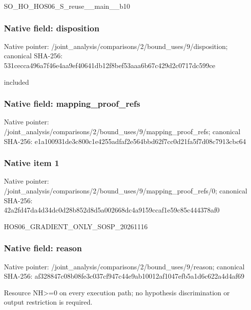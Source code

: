 \documentclass[10pt,a4paper]{article}
\begin{document}
\begingroup\raggedright\sloppy SO\_\allowbreak{}HO\_\allowbreak{}HOS06\_\allowbreak{}S\_\allowbreak{}reuse\_\allowbreak{}\_\allowbreak{}main\_\allowbreak{}\_\allowbreak{}b10\par\endgroup

\subsubsection{Native field: disposition}
Native pointer: /joint\_\allowbreak{}analysis/comparisons/2/bound\_\allowbreak{}uses/9/disposition; canonical SHA-256: 531cecca496a7f46e4aa9ef40641db12f8bef53aaa6b67c429d2c0717dc599ce

\begingroup\raggedright\sloppy included\par\endgroup

\subsubsection{Native field: mapping\_\allowbreak{}proof\_\allowbreak{}refs}
Native pointer: /joint\_\allowbreak{}analysis/comparisons/2/bound\_\allowbreak{}uses/9/mapping\_\allowbreak{}proof\_\allowbreak{}refs; canonical SHA-256: e1a100931de3c800c1e4255adfaf2e564bbd62f7cc0d21fa5f7d08c7913cbc64

\subsubsection{Native item 1}
Native pointer: /joint\_\allowbreak{}analysis/comparisons/2/bound\_\allowbreak{}uses/9/mapping\_\allowbreak{}proof\_\allowbreak{}refs/0; canonical SHA-256: 42a2fd47da4d34dc0d28b852d8d5a002668dc4a9159ccaf1e59c85c444378af0

\begingroup\raggedright\sloppy HOS06\_\allowbreak{}GRADIENT\_\allowbreak{}ONLY\_\allowbreak{}SOSP\_\allowbreak{}20261116\par\endgroup

\subsubsection{Native field: reason}
Native pointer: /joint\_\allowbreak{}analysis/comparisons/2/bound\_\allowbreak{}uses/9/reason; canonical SHA-256: af328847c08b08fe3c037cf947c44e9ab10012af1047efb5a1d6c622a4d4af69

\begingroup\raggedright\sloppy Resource NH>=\allowbreak{}0 on every execution path;\allowbreak{} no hypothesis discrimination or output restriction is required.\par\endgroup
\end{document}
